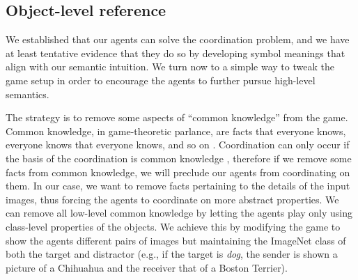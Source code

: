 \subsection{Object-level reference}
\label{sec:exp2}

We established that our agents can solve the coordination problem, and
we have at least tentative evidence that they do so by developing
symbol meanings that align with our semantic intuition. We turn now to
a simple way to tweak the game setup in order to encourage the agents
to further pursue high-level semantics. 

The strategy is to remove some
aspects of ``common knowledge'' from the game. Common knowledge, in
game-theoretic parlance, are facts that everyone knows, everyone knows
that everyone knows, and so on
\citep{brandenburger2014hierarchies}. Coordination can only occur if
the basis of the coordination is common knowledge
\citep{rubinstein1989electronic}, therefore if we remove some facts
from common knowledge, we will preclude our agents from coordinating
on them. In our case, we want to remove facts pertaining to the
details of the input images, thus forcing the agents to coordinate on
more abstract properties.
We can remove all low-level common knowledge by letting the agents
play only using class-level properties of the objects. We achieve this by modifying the game to show the agents different pairs of images but maintaining the ImageNet class of both the target and distractor (e.g., if the
target is \emph{dog}, the sender is shown a picture of a Chihuahua and
the receiver that of a Boston Terrier).

